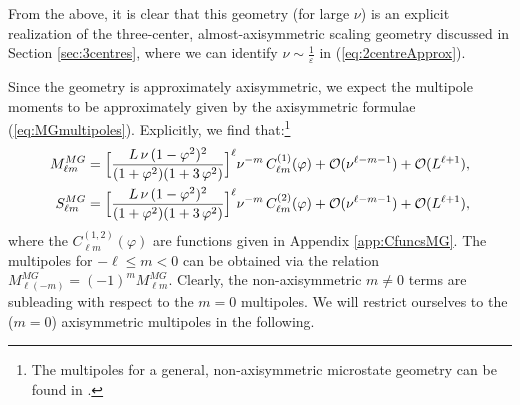 \documentclass[12pt,a4paper]{article}
\begin{document}
From the above, it is clear that this geometry (for large $\nu$) is an explicit realization of the three-center, almost-axisymmetric scaling geometry discussed in Section \ref{sec:3centres}, where we can identify $\nu\sim\frac{1}{\varepsilon}$ in (\ref{eq:2centreApprox}).

Since the geometry is approximately axisymmetric, we expect the multipole moments to be approximately given by the axisymmetric formulae (\ref{eq:MGmultipoles}). Explicitly, we find that:\footnote{The multipoles for a general, non-axisymmetric microstate geometry can be found in \cite{Bena:2020uup, Bianchi:2020miz}.}
\begin{align}\label{eq:MlmSlmLOexact}
M_{\ell m}^{MG}&=\Big[\frac{L\,\nu\,(1-\varphi^2)^2}{(1+\varphi^2)(1+3\,\varphi^2)}\Big]^\ell\nu^{-m}\,C^{(1)}_{\ell m}(\varphi)+\mathcal{O}(\nu^{\ell-m-1})+\mathcal{O}(L^{\ell+1}),\notag\\
S_{\ell m}^{MG}&=\Big[\frac{L\,\nu\,(1-\varphi^2)^2}{(1+\varphi^2)(1+3\,\varphi^2)}\Big]^\ell\nu^{-m}\,C^{(2)}_{\ell m}(\varphi)+\mathcal{O}(\nu^{\ell-m-1})+\mathcal{O}(L^{\ell+1}),
\end{align}
where the $C^{(1,2)}_{\ell m}(\varphi)$ are functions given in Appendix \ref{app:CfuncsMG}. The multipoles for $-\ell\leq m<0$ can be obtained via the relation $M_{\ell(-m)}^{MG}=(-1)^mM_{\ell m}^{MG}$. Clearly, the non-axisymmetric $m\neq 0$ terms are subleading with respect to the $m=0$ multipoles. We will restrict ourselves to the ($m=0$) axisymmetric multipoles in the following.
\end{document}
